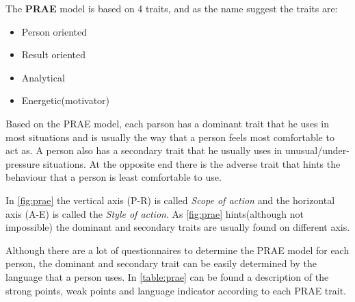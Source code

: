 The \textbf{PRAE} model is based on 4 traits, and as the name suggest the traits are:
\begin{itemize}
\item Person oriented
\item Result oriented
\item Analytical
\item Energetic(motivator)
\end{itemize}

Based on the PRAE model, each parson has a dominant trait that he uses in most situations and is usually the way that a person feels most comfortable to act as. A person also has a secondary trait that he usually uses in unusual/under-pressure situations. At the opposite end there is the adverse trait that hints the behaviour that a person is least comfortable to use.

In \ref{fig:prae} the vertical axis (P-R) is called \textit{Scope of action} and the horizontal axis (A-E) is called the \textit{Style of action}. As \ref{fig:prae} hints(although not impossible) the dominant and secondary traits are usually found on different axis. 

Although there are a lot of questionnaires to determine the PRAE model for each person, the dominant and secondary trait can be easily determined by the language that a person uses. In \ref{table:prae} can be found a description of the strong points, weak points and language indicator according to each PRAE trait.

